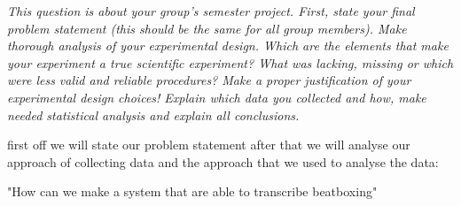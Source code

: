 \textit{This question is about your group’s semester project.
First, state your final problem statement (this should be the same for all group members).
Make thorough analysis of your experimental design. Which are the elements that make your experiment a true scientific experiment? What was lacking, missing or which were less valid and reliable procedures? Make a proper justification of your experimental design choices!
Explain which data you collected and how, make needed statistical analysis and explain all conclusions.}

first off we will state our problem statement after that we will analyse our approach of collecting data and the approach that we used to analyse the data:


"How can we make a system that are able to transcribe beatboxing"


